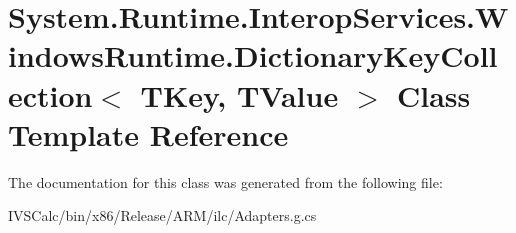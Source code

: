 \hypertarget{class_system_1_1_runtime_1_1_interop_services_1_1_windows_runtime_1_1_dictionary_key_collection}{}\section{System.\+Runtime.\+Interop\+Services.\+Windows\+Runtime.\+Dictionary\+Key\+Collection$<$ T\+Key, T\+Value $>$ Class Template Reference}
\label{class_system_1_1_runtime_1_1_interop_services_1_1_windows_runtime_1_1_dictionary_key_collection}


The documentation for this class was generated from the following file\+:\begin{DoxyCompactItemize}
\item 
I\+V\+S\+Calc/bin/x86/\+Release/\+A\+R\+M/ilc/Adapters.\+g.\+cs\end{DoxyCompactItemize}
